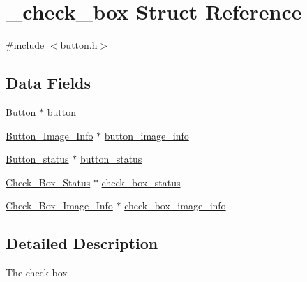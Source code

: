 \hypertarget{struct__check__box}{\section{\+\_\+check\+\_\+box Struct Reference}
\label{struct__check__box}
}


{\ttfamily \#include $<$button.\+h$>$}

\subsection*{Data Fields}
\begin{DoxyCompactItemize}
\item 
\hyperlink{button_8h_a7ac808241c1224e4caaee5a00ef0b231}{Button} $\ast$ \hyperlink{struct__check__box_afcbb5b54142bac4e305b31cbebe41064}{button}
\item 
\hyperlink{button_8h_aaaa592c3199b026905e2a99cd00c7110}{Button\+\_\+\+Image\+\_\+\+Info} $\ast$ \hyperlink{struct__check__box_abe7ec1033c8966c23ea31920649178bf}{button\+\_\+image\+\_\+info}
\item 
\hyperlink{button_8h_a380cba32ff506aefafa5ce913c2c972c}{Button\+\_\+status} $\ast$ \hyperlink{struct__check__box_af1ab6c7287e67a55a8e855e08302f8be}{button\+\_\+status}
\item 
\hyperlink{button_8h_a6b321fe14dd415e47f2933055f0f2b4a}{Check\+\_\+\+Box\+\_\+\+Status} $\ast$ \hyperlink{struct__check__box_ad26008f10118371ca26980a69e0c380b}{check\+\_\+box\+\_\+status}
\item 
\hyperlink{button_8h_a06caa2b1d7e930650baa45b83d37e297}{Check\+\_\+\+Box\+\_\+\+Image\+\_\+\+Info} $\ast$ \hyperlink{struct__check__box_a229649d419b5ff48d15261585e275619}{check\+\_\+box\+\_\+image\+\_\+info}
\end{DoxyCompactItemize}


\subsection{Detailed Description}
The check box 

